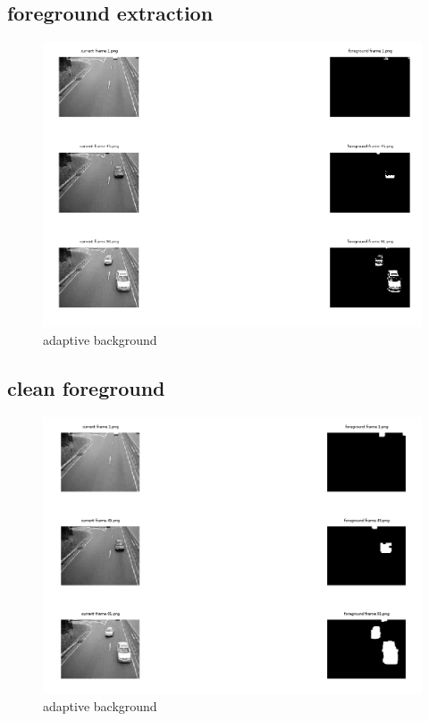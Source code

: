 \documentclass{article}
\begin{document}
	\subsection{foreground extraction}
	\begin{figure}[H]
		\includegraphics[width=\linewidth]{Q3/partA/partA.png}
		\caption{adaptive background}
	\end{figure}
	
	\subsection{clean foreground}
	\begin{figure}[H]
		\includegraphics[width=\linewidth]{Q3/partB/partB.png}
		\caption{adaptive background}
	\end{figure}
	
\end{document}

